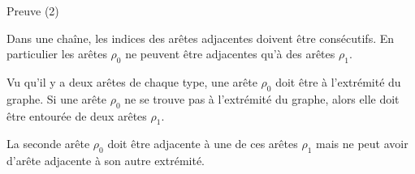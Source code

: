 \documentclass[10pt]{beamer}
\begin{document}
\begin{frame}{Preuve (2)}

  Dans une chaîne, les indices des arêtes adjacentes doivent être consécutifs. En particulier les arêtes $\rho_0$ ne peuvent être adjacentes qu'à des arêtes $\rho_1$.

  Vu qu'il y a deux arêtes de chaque type, une arête $\rho_0$ doit être à l'extrémité du graphe. Si une arête $\rho_0$ ne se trouve pas à l'extrémité du graphe, alors elle doit être entourée de deux arêtes $\rho_1$.

  \begin{figure}[H]
    \begin{center}
    \end{center}
  \end{figure}

  \pause

  La seconde arête $\rho_0$ doit être adjacente à une de ces arêtes $\rho_1$ mais ne peut avoir d'arête adjacente à son autre extrémité.

  \begin{figure}[H]
    \begin{center}
\end{center}
\end{figure}
\end{frame}
\end{document}
